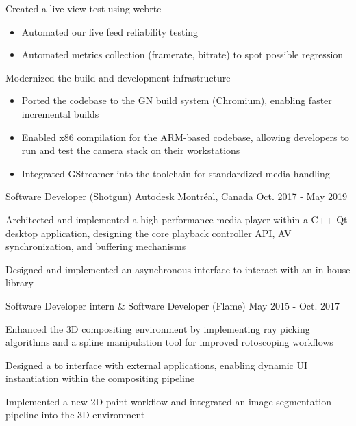 \begin{cventries}
{\begin{cvitems}
\item {Created a live view test  using webrtc}
  \begin{itemize}
    \item Automated our live feed reliability testing
    \item Automated metrics collection (framerate, bitrate) to spot possible regression
  \end{itemize}
\item {Modernized the build and development infrastructure}
  \begin{itemize}
    \item {Ported the codebase to the GN build system (Chromium), enabling faster incremental builds}
    \item {Enabled x86 compilation for the ARM-based codebase, allowing developers to run and test the camera stack on their workstations}
    \item {Integrated GStreamer into the toolchain for standardized media handling}
  \end{itemize}
\end{cvitems}
}

\cventry
{Software Developer (Shotgun)} %
{Autodesk} %
{Montréal, Canada} %
{Oct. 2017 - May 2019} %
{ %
\begin{cvitems}
\item {Architected and implemented a high-performance media player within a C++ Qt desktop application, designing the core playback controller API, AV synchronization, and buffering mechanisms}
\item {Designed and implemented an asynchronous interface to interact with an in-house library}
\end{cvitems}
}

\vspace{-4.0mm}
\cventry
{Software Developer intern \& Software Developer (Flame)} %
{} %
{} %
{May 2015 - Oct. 2017} %
{ %
\begin{cvitems}
\item {Enhanced the 3D compositing environment by implementing ray picking algorithms and a spline manipulation tool for improved rotoscoping workflows}
\item {Designed a  to interface with external applications, enabling dynamic UI instantiation within the compositing pipeline}
\item {Implemented a new 2D paint workflow and integrated an image segmentation pipeline into the 3D environment}
\end{cvitems}
}


\end{cventries}
